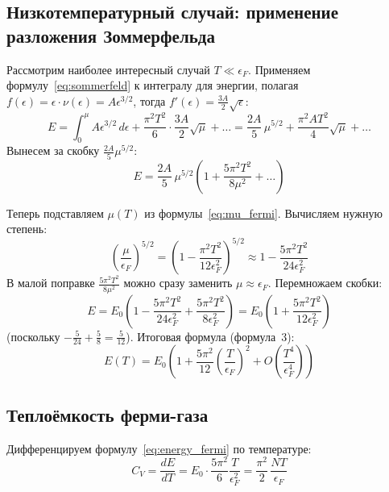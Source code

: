 \documentclass[../general/general]{subfiles}
\begin{document}
\subsection{Низкотемпературный случай: применение разложения Зоммерфельда}

Рассмотрим наиболее интересный случай $T \ll \epsilon_F$. Применяем формулу~\eqref{eq:sommerfeld} к интегралу для энергии, полагая $f(\epsilon) = \epsilon\cdot\nu(\epsilon) = A\epsilon^{3/2}$, тогда $f'(\epsilon) = \frac{3A}{2}\sqrt{\epsilon}$:
\begin{equation}
    E = \int_0^\mu A\epsilon^{3/2}\, d\epsilon + \frac{\pi^2 T^2}{6}\cdot\frac{3A}{2}\sqrt{\mu} + \ldots = \frac{2A}{5}\,\mu^{5/2} + \frac{\pi^2 A T^2}{4}\sqrt{\mu} + \ldots
\end{equation}
Вынесем за скобку $\frac{2A}{5}\mu^{5/2}$:
\begin{equation}
    E = \frac{2A}{5}\,\mu^{5/2}\!\left(1 + \frac{5\pi^2 T^2}{8\mu^2} + \ldots\right)
\end{equation}

Теперь подставляем $\mu(T)$ из формулы~\eqref{eq:mu_fermi}. Вычисляем нужную степень:
\begin{equation}
    \left(\frac{\mu}{\epsilon_F}\right)^{5/2} = \left(1 - \frac{\pi^2 T^2}{12\epsilon_F^2}\right)^{5/2} \approx 1 - \frac{5\pi^2 T^2}{24\epsilon_F^2}
\end{equation}
В малой поправке $\frac{5\pi^2 T^2}{8\mu^2}$ можно сразу заменить $\mu \approx \epsilon_F$. Перемножаем скобки:
\begin{equation}
    E = E_0\!\left(1 - \frac{5\pi^2 T^2}{24\epsilon_F^2} + \frac{5\pi^2 T^2}{8\epsilon_F^2}\right) = E_0\!\left(1 + \frac{5\pi^2 T^2}{12\epsilon_F^2}\right)
\end{equation}
(поскольку $-\frac{5}{24} + \frac{5}{8} = \frac{5}{12}$). Итоговая формула (формула~3):
\begin{equation}
    \boxed{E(T) = E_0\!\left(1 + \frac{5\pi^2}{12}\left(\frac{T}{\epsilon_F}\right)^2 + O\!\left(\frac{T^4}{\epsilon_F^4}\right)\right)}
    \label{eq:energy_fermi}
\end{equation}

\subsection{Теплоёмкость ферми-газа}

Дифференцируем формулу~\eqref{eq:energy_fermi} по температуре:
\begin{equation}
    C_V = \frac{dE}{dT} = E_0 \cdot \frac{5\pi^2}{6}\frac{T}{\epsilon_F^2} = \frac{\pi^2}{2}\,\frac{NT}{\epsilon_F}
\end{equation}
\end{document}
